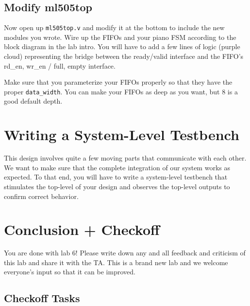 \documentclass[11pt]{article}
\begin{document}
\subsection{Modify ml505top}
Now open up \verb|ml505top.v| and modify it at the bottom to include the new modules you wrote. Wire up the FIFOs and your piano FSM according to the block diagram in the lab intro. You will have to add a few lines of logic (purple cloud) representing the bridge between the ready/valid interface and the FIFO's rd\_en, wr\_en / full, empty interface. 

Make sure that you parameterize your FIFOs properly so that they have the proper \verb|data_width|. You can make your FIFOs as deep as you want, but 8 is a good default depth.

\section{Writing a System-Level Testbench}
This design involves quite a few moving parts that communicate with each other. We want to make sure that the complete integration of our system works as expected. To that end, you will have to write a system-level testbench that stimulates the top-level of your design and observes the top-level outputs to confirm correct behavior.


\section{Conclusion + Checkoff}
You are done with lab 6! Please write down any and all feedback and criticism of this lab and share it with the TA. This is a brand new lab and we welcome everyone's input so that it can be improved.


\subsection{Checkoff Tasks}
\end{document}
